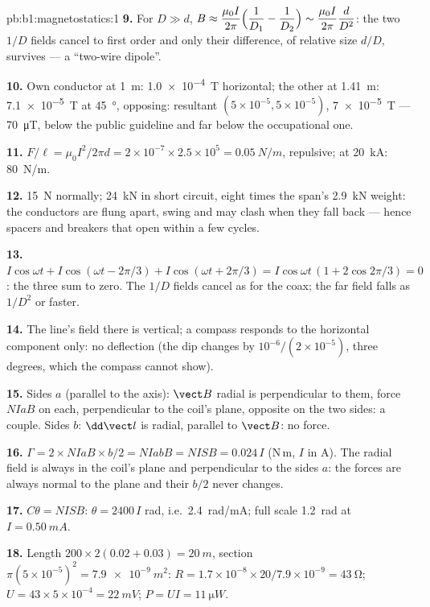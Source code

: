 \begin{solution}{pb:b1:magnetostatics:1}
\textbf{9.} For $D \gg d$, $B \approx \dfrac{\mu_0I}{2\pi}\Bigl(\dfrac1{D_1} - \dfrac1{D_2}\Bigr)
\sim \dfrac{\mu_0I}{2\pi}\dfrac{d}{D^2}$: the two $1/D$ fields cancel to first
order and only their difference, of relative size $d/D$, survives --- a
``two-wire dipole''.

\textbf{10.} Own conductor at \qty{1}{m}: \qty{1.0e-4}{T} horizontal; the other
at \qty{1.41}{m}: \qty{7.1e-5}{T} at \qty{45}{\degree}, opposing: resultant
$(5 \times 10^{-5}, 5 \times 10^{-5})$, \qty{7e-5}{T} --- \qty{70}{\micro T}, below the
public guideline and far below the occupational one.

\textbf{11.} $F/\ell = \mu_0I^2/2\pi d = 2 \times 10^{-7} \times 2.5 \times 10^5 =
\qty{0.05}{N/m}$, repulsive; at \qty{20}{kA}: \qty{80}{N/m}.

\textbf{12.} \qty{15}{N} normally; \qty{24}{kN} in short circuit, eight times
the span's \qty{2.9}{kN} weight: the conductors are flung apart, swing
and may clash when they fall back --- hence spacers and breakers that
open within a few cycles.

\textbf{13.} $I\cos\omega t + I\cos(\omega t - 2\pi/3) + I\cos(\omega t + 2\pi/3) =
I\cos\omega t\,(1 + 2\cos2\pi/3) = 0$: the three  sum to zero. The
$1/D$ fields cancel as for the coax; the far field falls as $1/D^2$ or
faster.

\textbf{14.} The line's field there is vertical; a compass responds to
the horizontal component only: no deflection (the dip changes by
$10^{-6}/(2 \times 10^{-5})$, three degrees, which the compass cannot show).

\textbf{15.} Sides $a$ (parallel to the axis): $\vect B$ radial is
perpendicular to them, force $NIaB$ on each, perpendicular to the
coil's plane, opposite on the two sides: a couple. Sides $b$: $\dd\vect l$
is radial, parallel to $\vect B$: no force.

\textbf{16.} $\Gamma = 2 \times NIaB \times b/2 = NIabB = NISB = 0.024\,I$ (N\,m, $I$
in A). The radial field is always in the coil's plane and perpendicular
to the sides $a$: the forces are always normal to the plane and their
 $b/2$ never changes.

\textbf{17.} $C\theta = NISB$: $\theta = 2400\,I$ rad, i.e.\ \qty{2.4}{rad/mA}; full
scale \qty{1.2}{rad} at $I = \qty{0.50}{mA}$.

\textbf{18.} Length $200 \times 2(0.02 + 0.03) = \qty{20}{m}$, section $\pi(5 \times
10^{-5})^2 = \qty{7.9e-9}{m^2}$: $R = 1.7 \times 10^{-8} \times 20/7.9 \times 10^{-9} =
\qty{43}{\ohm}$; $U = 43 \times 5 \times 10^{-4} = \qty{22}{mV}$; $P = UI = \qty{11}{\micro W}$.


\end{solution}
